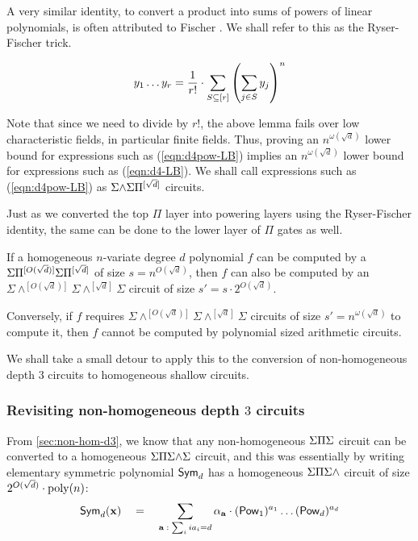 A very similar identity, to convert a product into sums of powers of
linear polynomials, is often attributed to Fischer \cite{fischer}.
We shall refer to this as the Ryser-Fischer trick. 

\begin{lemma}\label{lem:ryser-fischer}
$$y_1 \dots y_r  = \frac{1}{r!} \cdot \sum_{S\subseteq [r]} \left(\sum_{j\in S} y_j\right)^n$$
\end{lemma}

Note that since we need to divide by $r!$, the above lemma fails over
low characteristic fields, in particular finite fields.
Thus, proving an $n^{\omega(\sqrt{d})}$ lower bound for expressions
such as (\ref{eqn:d4pow-LB}) implies an $n^{\omega(\sqrt{d})}$ lower
bound for expressions such as (\ref{eqn:d4-LB}).
We shall call expressions such as (\ref{eqn:d4pow-LB}) as
$\Sigma\mathord{\wedge}\Sigma\Pi^{[\sqrt{d}]}$ circuits. 

Just as we converted the top $\Pi$ layer into powering layers using
the Ryser-Fischer identity, the same can be done to the lower layer of
$\Pi$ gates as well.

\begin{corollary}\label{cor:pow-genckt}
  If a homogeneous $n$-variate degree $d$ polynomial $f$ can be
  computed by a $\Sigma\Pi^{[O(\sqrt{d})]}\Sigma\Pi^{[\sqrt{d}]}$ of size $s =
  n^{O(\sqrt{d})}$, then $f$ can also be computed by an
  $\Sigma\mathord{\wedge^{[O(\sqrt{d})]}}\Sigma\mathord{\wedge^{[\sqrt{d}]}}\Sigma$
  circuit of size $s' = s \cdot 2^{O(\sqrt{d})}$. 

  Conversely, if $f$ requires
  $\Sigma\mathord{\wedge^{[O(\sqrt{d})]}}\Sigma\mathord{\wedge^{[\sqrt{d}]}}\Sigma$
  circuits of size $s' = n^{\omega(\sqrt{d})}$ to compute it, then $f$
  cannot be computed by polynomial sized arithmetic circuits. 
\end{corollary}

We shall take a small detour to apply this to the conversion of non-homogeneous depth $3$
circuits  to homogeneous shallow circuits.

\subsubsection{Revisiting non-homogeneous depth $3$ circuits}

From \autoref{sec:non-hom-d3}, we know that any non-homogeneous $\Sigma\Pi\Sigma$
circuit can be converted to a homogeneous $\Sigma\Pi\Sigma\mathord{\wedge}\Sigma$ circuit, and
this was essentially by writing elementary symmetric polynomial
$\operatorname{\mathsf{Sym}}_d$ has a homogeneous $\Sigma\Pi\Sigma\mathord{\wedge}$ circuit of size $2^{O(\sqrt{d})}
\cdot \operatorname{poly}(n)$:
\[
\operatorname{\mathsf{Sym}}_d(\mathbf{x}) \quad = \quad \sum_{\mathbf{a}\;:\; \sum_i ia_i = d} \alpha_{\mathbf{a}} \cdot (\operatorname{\mathsf{Pow}}_1)^{a_1}\dots (\operatorname{\mathsf{Pow}}_d)^{a_d}
\]

